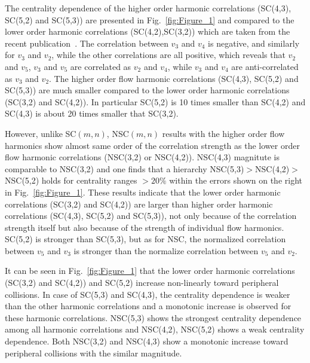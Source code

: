 \documentclass[ALICE,manyauthors]{cernphprep}
\begin{document}
The centrality dependence of the higher order harmonic correlations (SC(4,3), SC(5,2) and SC(5,3)) are presented in Fig.~\ref{fig:Figure_1} and compared to the lower order harmonic correlations (SC(4,2),SC(3,2)) which are taken from the recent publication~\cite{ALICE:2016kpq}. The correlation between $v_3$ and $v_4$ is negative, and similarly for $v_3$ and $v_2$, while the other correlations are all positive, which reveals that $v_2$ and $v_5$, $v_3$ and $v_5$ are correlated as $v_2$ and $v_4$, while $v_3$ and $v_4$ are anti-correlated as $v_3$ and $v_2$.
The higher order flow harmonic correlations (SC(4,3), SC(5,2) and SC(5,3)) are much smaller compared to the lower order harmonic correlations (SC(3,2) and SC(4,2)).
In particular SC(5,2) is 10 times smaller than SC(4,2) and SC(4,3) is about 20 times smaller that SC(3,2).

However, unlike SC$(m,n)$, NSC$(m,n)$ results with the higher order flow harmonics show almost same order of the correlation strength as the lower order flow harmonic correlations (NSC(3,2) or NSC(4,2)).
NSC(4,3) magnitute is comparable to NSC(3,2) and one finds that a hierarchy NSC(5,3)$>$NSC(4,2)$>$NSC(5,2) holds for centrality ranges $>20\%$ within the errors shown on the right in Fig.~\ref{fig:Figure_1}.
These results indicate that the lower order harmonic correlations (SC(3,2) and SC(4,2)) are larger than higher order harmonic correlations (SC(4,3), SC(5,2) and SC(5,3)), not only because of the correlation strength itself but also because of the strength of individual flow harmonics. 
SC(5,2) is stronger than SC(5,3), but as for NSC, the normalized correlation between $v_5$ and $v_3$ is stronger than the normalize correlation between $v_5$ and $v_2$. 

It can be seen in Fig.~\ref{fig:Figure_1} that the lower order harmonic correlations (SC(3,2) and SC(4,2)) and SC(5,2) increase non-linearly toward peripheral collisions.
In case of SC(5,3) and SC(4,3), the centrality dependence is weaker than the other harmonic correlations and a monotonic increase is observed for these harmonic correlations.
NSC(5,3) shows the strongest centrality dependence among all harmonic correlations and NSC(4,2), NSC(5,2) shows a weak centrality dependence.
Both NSC(3,2) and NSC(4,3) show a monotonic increase toward peripheral collisions with the similar magnitude.
\end{document}
